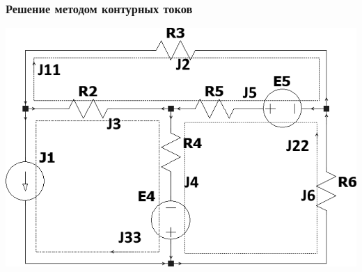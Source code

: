 \documentclass[12pt]{article}
\begin{document}
		\subsubsection*{Решение методом контурных токов}
		\begin{center}
			{\includegraphics[scale=0.8]{3}}
			\par\bigskip
		\end{center}
\end{document}
